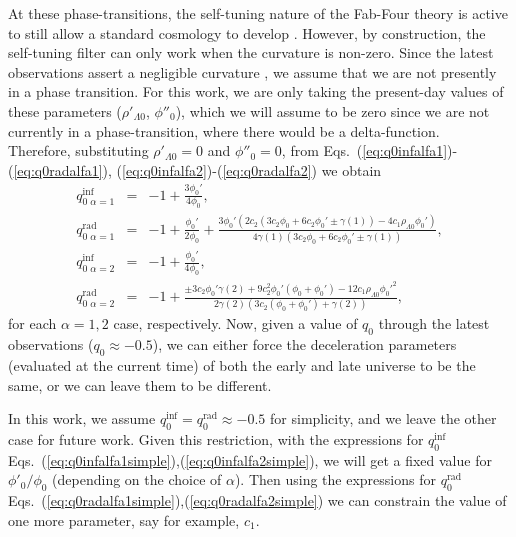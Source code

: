 \documentclass[onecolumn,superscriptaddress,secnumarabic,amssymb,amsmath,nobibnotes,aps,prd,nofootinbib,altaffilletter]{revtex4}
\begin{document}
At these phase-transitions, the self-tuning nature of the Fab-Four theory is active to still allow a standard cosmology to develop \cite{Charmousis_2012}. However, by construction, the self-tuning filter can only work when the curvature is non-zero. Since the latest observations assert a negligible curvature \cite{Planck_2020}, we assume that we are not presently in a phase transition. 
For this work, we are only taking the present-day values of these parameters ($\rho'_{\Lambda 0}$, $\phi''_0$), which we will assume to be zero since we are not currently in a phase-transition, where there would be a delta-function. \\

Therefore, substituting $\rho'_{\Lambda 0}=0$ and $\phi''_0 =0$, from Eqs.~(\ref{eq:q0infalfa1})-(\ref{eq:q0radalfa1}), (\ref{eq:q0infalfa2})-(\ref{eq:q0radalfa2}) we obtain
\begin{eqnarray}
    q^{\text{inf}}_{0 \; \alpha=1}&=&-1 + \frac{3\phi_0'}{4\phi_0},
    \label{eq:q0infalfa1simple}\\
    q_{0 \; \alpha=1}^{\text{rad}}&=&-1 + \frac{\phi_0'}{2\phi_0} + \frac{3\phi_0'\left(2c_2(3c_2\phi_0 + 6c_2\phi_0' \pm \gamma(1)) - 4c_1\rho_{\Lambda 0}\phi_0'\right)}{4\gamma(1)\left(3c_2\phi_0 + 6c_2\phi_0' \pm \gamma(1)\right)},
    \label{eq:q0radalfa1simple}\\
    q^{\text{inf}}_{0 \; \alpha=2}&=&-1+\frac{\phi_0'}{4\phi_0}
    \label{eq:q0infalfa2simple},\\
    q_{0 \; \alpha=2}^{\text{rad}}&=&-1 + \frac{\pm3c_2\phi_0' \gamma(2) + 9c_2^2\phi_0'(\phi_0+\phi_0')-12c_1\rho_{\Lambda 0}{\phi_0'}^2}{2\gamma(2)(3c_2(\phi_0 + \phi_0') + \gamma(2))}
    \label{eq:q0radalfa2simple},
\end{eqnarray}
for each $\alpha=1,2$ case, respectively. Now, given a value of $q_0$ through the latest observations \cite{Riess_2022} ($q_0\approx -0.5$), we can either force the deceleration parameters (evaluated at the current time) of both the early and late universe to be the same, or we can leave them to be different. 

In this work, we assume $q_0^{\text{inf}}=q_0^{\text{rad}}\approx -0.5$ for simplicity, and we leave the other case for future work. Given this restriction, with the expressions for $q_0^{\text{inf}}$ Eqs.~(\ref{eq:q0infalfa1simple}),(\ref{eq:q0infalfa2simple}), we will get a fixed value for $\phi'_0 / \phi_0$ (depending on the choice of $\alpha$). Then using the expressions for $q_0^{\text{rad}}$ Eqs.~(\ref{eq:q0radalfa1simple}),(\ref{eq:q0radalfa2simple}) we can constrain the value of one more parameter, say for example, $c_1$.
\end{document}
